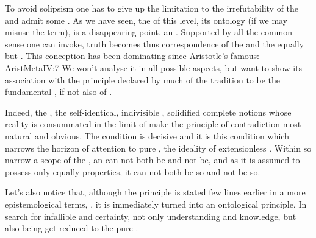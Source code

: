 To avoid solipsism one has to give up the limitation to the irrefutability of
  the  and admit some 
. As we have seen, the  of this level, 
its ontology (if we may misuse the term), is a disappearing point, an
. Supported by all the common-sense one can
invoke, truth becomes thus correspondence of the  and the equally  but . This
conception
has been dominating since Aristotle's famous:
\citet{To say of what is that it is not, or of what is not that it is, is false,
while to say of what is that it is, or of what is not that it is not, is
true.}{AristMeta}{IV:7} We won't analyse it in all possible
aspects, but want to show its association with the principle declared by much of
the tradition to be the fundamental , if not also of
. 


\pa\label{pa:logicA}  Indeed, the , the
self-identical, indivisible , solidified complete notions whose
reality is consummated in the  limit of  make the
principle of contradiction most natural and obvious.  The condition  is decisive and it is this condition which narrows the horizon of
attention to pure , the ideality of extensionless .
Within so narrow a scope of the \hoa, an  can not both be and not-be,
and as it is assumed to possess only equally  properties, it can
not both be-so and not-be-so.

Let's also notice that, although the principle is stated few lines earlier in a
more epistemological terms, , it is immediately turned
into an ontological principle.  In search for infallible and 
certainty, not only understanding and  knowledge, but also being
get reduced to the pure .

